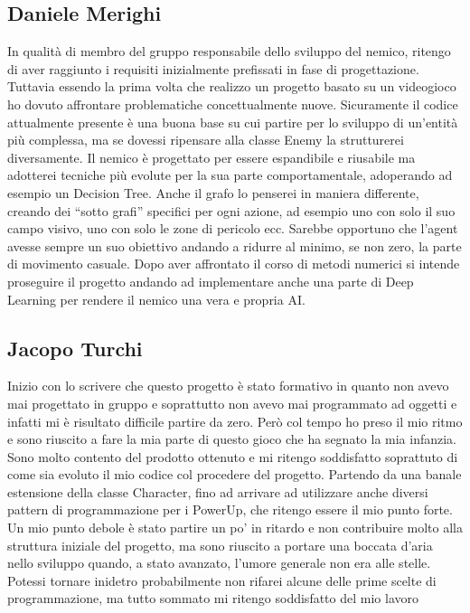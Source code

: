 \documentclass[a4paper,12pt]{report}
\begin{document}
\subsection{Daniele Merighi}
\par
In qualità di membro del gruppo responsabile dello sviluppo del nemico, ritengo di aver raggiunto i requisiti inizialmente prefissati in fase di progettazione. Tuttavia essendo la prima volta che realizzo un progetto basato su un videogioco ho dovuto affrontare problematiche concettualmente nuove. Sicuramente il codice attualmente presente è una buona base su cui partire per lo sviluppo di un’entità più complessa, ma se dovessi ripensare alla classe Enemy la strutturerei diversamente. Il nemico è progettato per essere espandibile e riusabile ma adotterei tecniche più evolute per la sua parte comportamentale, adoperando ad esempio un Decision Tree. Anche il grafo lo penserei in maniera differente, creando dei “sotto grafi” specifici per ogni azione, ad esempio uno con solo il suo campo visivo, uno con solo le zone di pericolo ecc. Sarebbe opportuno che l’agent avesse sempre un suo obiettivo andando a ridurre al minimo, se non zero, la parte di movimento casuale. Dopo aver affrontato il corso di metodi numerici si intende proseguire il progetto andando ad implementare anche una parte di Deep Learning per rendere il nemico una vera e propria AI.

\subsection{Jacopo Turchi}
\par
Inizio con lo scrivere che questo progetto è stato formativo in quanto non avevo mai progettato in gruppo e soprattutto non avevo mai programmato ad oggetti e infatti mi è risultato difficile partire da zero. Però col tempo ho preso il mio ritmo e sono riuscito a fare la mia parte di questo gioco che ha segnato la mia infanzia. Sono molto contento del prodotto ottenuto e mi ritengo soddisfatto soprattuto di come sia evoluto il mio codice col procedere del progetto. Partendo da una banale estensione della classe Character, fino ad arrivare ad utilizzare anche diversi pattern di programmazione per i PowerUp, che ritengo essere il mio punto forte. Un mio punto debole è stato partire un po' in ritardo e non contribuire molto alla struttura iniziale del progetto, ma sono riuscito a portare una boccata d'aria nello sviluppo quando, a stato avanzato, l'umore generale non era alle stelle. Potessi tornare inidetro probabilmente non rifarei alcune delle prime scelte di programmazione, ma tutto sommato mi ritengo soddisfatto del mio lavoro
\end{document}
